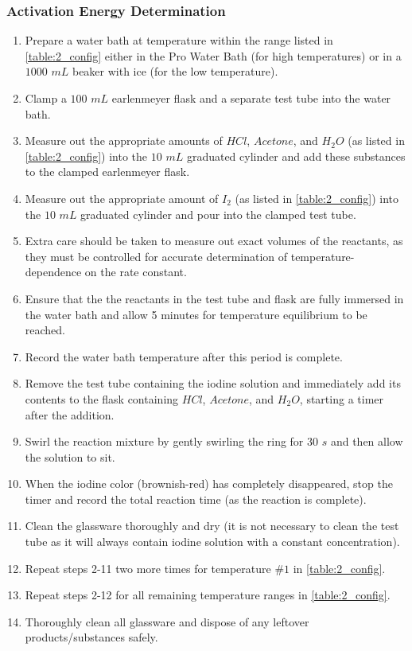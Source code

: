 \subsubsection{Activation Energy Determination}
	\begin{enumerate}[itemsep=-1ex]
	  \item Prepare a water bath at temperature within the range listed in \cref{table:2_config} either in the Pro Water Bath (for high temperatures) or in a $1000$ $mL$ beaker with ice (for the low temperature).
	  \item Clamp a $100$ $mL$ earlenmeyer flask and a separate test tube into the water bath.
	  \item Measure out the appropriate amounts of $HCl$, $Acetone$, and $H_2O$ (as listed in \cref{table:2_config}) into the $10$ $mL$ graduated cylinder and add these substances to the clamped earlenmeyer flask.
	  \item Measure out the appropriate amount of $I_2$ (as listed in \cref{table:2_config}) into the $10$ $mL$ graduated cylinder and pour into the clamped test tube.
	  \item Extra care should be taken to measure out exact volumes of the reactants, as they must be controlled for accurate determination of temperature-dependence on the rate constant.
	  \item Ensure that the the reactants in the test tube and flask are fully immersed in the water bath and allow 5 minutes for temperature equilibrium to be reached.
	  \item Record the water bath temperature after this period is complete.
	  \item Remove the test tube containing the iodine solution and immediately add its contents to the flask containing $HCl$, $Acetone$, and $H_2O$, starting a timer after the addition.
	  \item Swirl the reaction mixture by gently swirling the ring for $30$ $s$ and then allow the solution to sit.
	  \item When the iodine color (brownish-red) has completely disappeared, stop the timer and record the total reaction time (as the reaction is complete).
	  \item Clean the glassware thoroughly and dry (it is not necessary to clean the test tube as it will always contain iodine solution with a constant concentration).
	  \item Repeat steps 2-11 two more times for temperature $\#1$ in \cref{table:2_config}.
	  \item Repeat steps 2-12 for all remaining temperature ranges in \cref{table:2_config}.
	  \item Thoroughly clean all glassware and dispose of any leftover products/substances safely.
	\end{enumerate}

